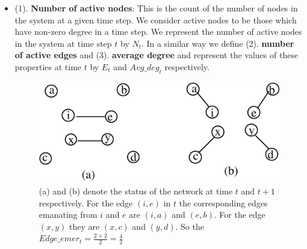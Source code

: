  \begin{itemize} 
  \item (1). {\bf  Number of active nodes}: This is the count of the number of nodes in the system at a given time step. We consider active nodes to be those which have non-zero degree in a time step. We represent the number of active nodes in the system at time step {$t$} by {$N_{t}$}.
  In a similar way we define (2). {\bf number of active edges} and (3). {\bf average degree} and represent the values of these properties at time $t$ by $E_t$ and $Avg\_deg_{t}$ respectively.

\begin{figure}[h]
 \begin{center}
 
 \includegraphics[width=0.7\columnwidth, angle=0]{./texfiles/Chapter_1/fig/ede_em-eps-converted-to.pdf}
 \caption{\label{chap_1_fig3}(a) and (b) denote the status of the network at time $t$ and $t+1$ respectively. For the edge $(i,e)$ in $t$ the corresponding edges
 emanating from $i$ and $e$ are $(i,a)$ and $(e,b)$. For the edge $(x,y)$ they are $(x,c)$ and $(y,d)$. So the $Edge\_emer_{t}=\frac{2+2}{2}=\frac{4}{2}$}
 

\end{center}
\end{figure}
\end{itemize}
